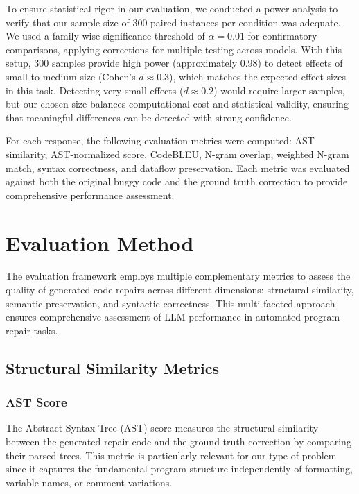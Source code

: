 
To ensure statistical rigor in our evaluation, we conducted a power analysis to verify that our sample size of 300 paired instances per condition was adequate. We used a family-wise significance threshold of $\alpha = 0.01$ for confirmatory comparisons, applying corrections for multiple testing across models. With this setup, 300 samples provide high power (approximately 0.98) to detect effects of small-to-medium size (Cohen's $d \approx 0.3$), which matches the expected effect sizes in this task. Detecting very small effects ($d \approx 0.2$) would require larger samples, but our chosen size balances computational cost and statistical validity, ensuring that meaningful differences can be detected with strong confidence.

For each response, the following evaluation metrics were computed: AST similarity, AST-normalized score, CodeBLEU, N-gram overlap, weighted N-gram match, syntax correctness, and dataflow preservation. Each metric was evaluated against both the original buggy code and the ground truth correction to provide comprehensive performance assessment.

\section{Evaluation Method}
\label{sec:evaluation-method}

The evaluation framework employs multiple complementary metrics to assess the quality of generated code repairs across different dimensions: structural similarity, semantic preservation, and syntactic correctness. This multi-faceted approach ensures comprehensive assessment of LLM performance in automated program repair tasks.

\subsection{Structural Similarity Metrics}

\subsubsection{AST Score}
The Abstract Syntax Tree (AST) score measures the structural similarity between the generated repair code and the ground truth correction by comparing their parsed trees. This metric is particularly relevant for our type of problem since it captures the fundamental program structure independently of formatting, variable names, or comment variations.

